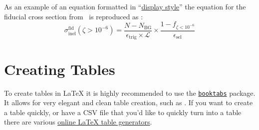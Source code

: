 As an example of an equation formatted in ``\href{https://www.overleaf.com/learn/latex/Display_style_in_math_mode}{display style}'' the equation for the fiducial cross section from~\cite{Aaboud:2016mmw} is reproduced as :
\begin{equation}
 \sigma_{\mathrm{inel}}^{\mathrm{fid}} \left(\zeta > 10^{-6}\right) = \frac{N - N_{\mathrm{BG}}}{\epsilon_{\mathrm{trig}} \times \mathcal{L}} \times \frac{1 - f_{\zeta < 10^{-6}}}{\epsilon_{\mathrm{sel}}}
 \label{eq:fiducial_cross_section}
\end{equation}

\section{Creating Tables}\label{sec:tables}

To create tables in \LaTeX{} it is highly recommended to use the \href{https://www.ctan.org/pkg/booktabs}{\texttt{booktabs}} package.
It allows for very elegant and clean table creation, such as .
If you want to create a table quickly, or have a CSV file that you'd like to quickly turn into a table there are various \href{https://www.tablesgenerator.com/}{online \LaTeX{} table generators}.


